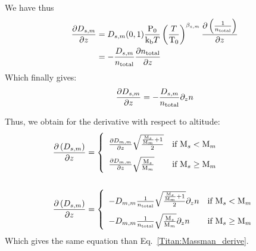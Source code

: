 We have thus
\begin{equation}
\begin{split}
\frac{\partial D_{s,m}}{\partial z} & = D_{s,m}(0,1) \frac{\mathrm{P_0}}{\text{k}_\text{b} T}\left(\frac{T}{\mathrm{T_0}}\right)^{\beta_{s,m}} \frac{\partial\left(\frac{1}{n_\text{total}}\right)}{\partial z}\\
                      & = -\frac{D_{s,m}}{n_\text{total}}\frac{\partial n_\text{total}}{\partial z}
\end{split}
\end{equation}
Which finally gives:
\begin{equation}
\frac{\partial D_{s,m}}{\partial z}  = -\frac{D_{s,m}}{n_\text{total}}\partial_{z}{n}
\label{Titan:Massman_derive}
\end{equation}

Thus, we obtain for the derivative with respect to altitude:
\begin{equation}
\begin{split}
\renewcommand{\arraystretch}{2}
\dOverdz{\diff_{s,m}} & =
\left\{\begin{array}{l@{\quad}r}
\doverdz{\diff_{m,m}}\sqrt{\frac{\frac{\Mm_s}{\Mm_m} + 1}{2}}  & \text{if } \Mm_s < \Mm_m    \\
\doverdz{\diff_{m,m}}\sqrt{\frac{\Mm_s}{\Mm_m}}                & \text{if } \Mm_s \geq \Mm_m \\
\end{array}\right. 
\\\\
\dOverdz{\diff_{s,m}} & =
\left\{\begin{array}{l@{\quad}r}
-\diff_{m,m}\frac{1}{\concAtm}\sqrt{\frac{\frac{\Mm_s}{\Mm_m} + 1}{2}}\gradienz{\conc}  & \text{if } \Mm_s < \Mm_m    \\
-\diff_{m,m}\frac{1}{\concAtm}\sqrt{\frac{\Mm_s}{\Mm_m}}\gradienz{\conc}                & \text{if } \Mm_s \geq \Mm_m \\
\end{array}\right. 
\end{split}
\label{Titan:diffusion_no_data_derive}
\end{equation}
Which gives the same equation than Eq.~\ref{Titan:Massman_derive}.


